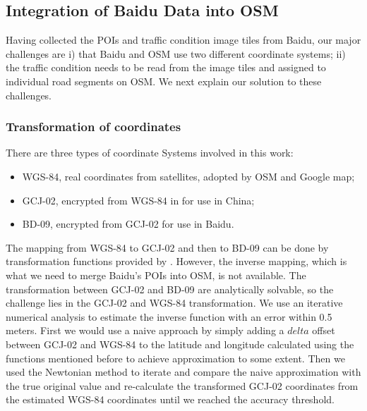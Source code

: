 \subsection{Integration of Baidu Data into OSM}
\label{sec:integrate}
Having collected the POIs and traffic condition image tiles from Baidu,
our major challenges are i) that Baidu and OSM use two different 
coordinate systems; ii) the traffic condition needs to be read from
the image tiles and assigned to individual road segments on OSM. 
We next explain our solution to these challenges.

\subsubsection{Transformation of coordinates}
There are three types of coordinate Systems involved in this work:
\begin{itemize}\itemsep0pt
    \item WGS-84, real coordinates from satellites, adopted by OSM and Google map;
    \item GCJ-02, encrypted from WGS-84 in for use in China;
    \item BD-09, encrypted from GCJ-02 for use in Baidu.
\end{itemize}

The mapping from WGS-84 to GCJ-02 and then to BD-09 can be done 
by transformation functions provided by \cite{coordinatechange}.
However, the inverse mapping, which is what we need to merge
Baidu's POIs into OSM, is not available. The transformation between GCJ-02 and BD-09 are analytically solvable, so the challenge lies in the GCJ-02 and WGS-84 transformation. We use an iterative numerical analysis to estimate the inverse function with an error within 0.5 meters. First we would use a naive approach by simply adding a $delta$ offset between GCJ-02 and WGS-84 to the latitude and longitude calculated using the functions mentioned before to achieve approximation to some extent. Then we used the
Newtonian method to iterate and compare 
the naive approximation with the true original value and re-calculate 
the transformed GCJ-02 coordinates from the estimated 
WGS-84 coordinates until we reached the accuracy threshold. 

